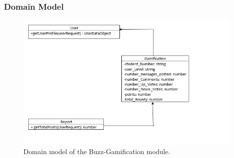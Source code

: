 \subsubsection{Domain Model}
\begin{figure}[h!]
\includegraphics[width=\linewidth]
{Diagrams/gamificationDomainModel.jpeg}
\caption {Domain model of the Buzz-Gamification module.}
\end{figure}
